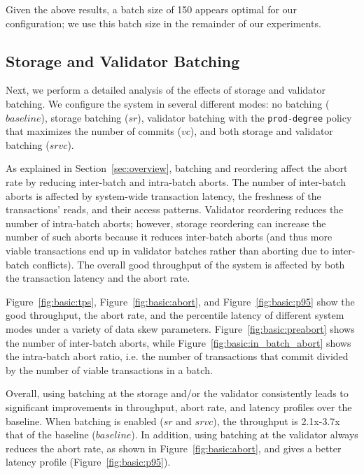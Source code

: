 Given the above results, a batch size of 150 appears optimal for our configuration; we use this batch size in the remainder of our experiments. 

\subsection{Storage and Validator Batching}
\label{subsec:experiment:batching}

Next, we perform a detailed analysis of the effects of storage and validator batching. We configure the system in several different modes: no batching ($baseline$), storage batching ($sr$), validator batching with the \texttt{prod-degree} policy that maximizes the number of commits ($vc$), and both storage and validator batching ($srvc$).


As explained in Section~\ref{sec:overview}, batching and reordering affect the abort rate by reducing inter-batch and intra-batch aborts. The number of inter-batch aborts is affected by system-wide transaction latency, the freshness of the transactions' reads, and their access patterns. Validator reordering reduces the number of intra-batch aborts; however, storage reordering can increase the number of such aborts because it reduces inter-batch aborts (and thus more viable transactions end up in validator batches rather than aborting due to inter-batch conflicts). The overall good throughput of the system is affected by both the transaction latency and the abort rate. 


Figure~\ref{fig:basic:tps}, Figure~\ref{fig:basic:abort}, and Figure~\ref{fig:basic:p95} show the good throughput, the abort rate, and the percentile latency of different system modes under a variety of data skew parameters. Figure~\ref{fig:basic:preabort} shows the number of inter-batch aborts, while Figure~\ref{fig:basic:in_batch_abort} shows the intra-batch abort ratio, i.e. the number of transactions that commit divided by the number of viable transactions in a batch.


Overall, using batching at the storage and/or the validator consistently leads to significant improvements in throughput, abort rate, and latency profiles over the baseline. When batching is enabled ($sr$ and $srvc$), the throughput is 2.1x-3.7x that of the baseline ($baseline$). In addition, using batching at the validator always reduces the abort rate, as shown in Figure~\ref{fig:basic:abort}, and gives a better latency profile (Figure~\ref{fig:basic:p95}).

